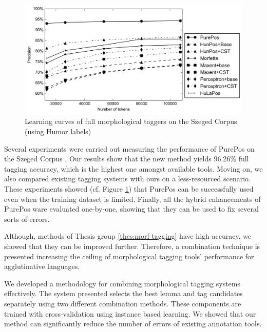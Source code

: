 \begin{figure}[H]
  \centering
  \includegraphics[width=1\textwidth]{MorphTagging/msd_token.png}
  \caption{Learning curves of full morphological taggers on the Szeged Corpus (using Humor labels)}
  \label{fig:humor-token_en}
\end{figure}

Several experiments were carried out measuring the performance of PurePos on the Szeged Corpus \cite{Csendes2004}.
Our results show that the new method yields 96.26\% full tagging accuracy, which is the highest one amongst available tools.
Moving on, we also compared existing tagging systems with ours on a less-resourced scenario.
These experiments showed (cf. Figure \ref{fig:humor-token_en}) that PurePos can be successfully used even when the training dataset is limited.
Finally, all the hybrid enhancements of PurePos ware evaluated one-by-one, showing that they can be used to fix several sorts of errors.


\thesisline%

Although, methods of Thesis group \ref{thes:morf-tagging} have high accuracy, we showed that they can be improved further.  
Therefore, a combination technique is presented increasing the ceiling of morphological tagging tools' performance for agglutinative languages.


\begin{core}
\begin{thesis}
We developed a methodology for combining morphological tagging systems effectively.
The system presented selects the best lemma and tag candidates separately using two different combination methods.
These components are trained with cross-validation using instance based learning.
We showed that our method can significantly reduce the number of errors of existing annotation tools.
\end{thesis}

\begin{pub}
\cite{Laki2013a,Orosz2013c,Orosz2013d} 
\end{pub}
\end{core}

